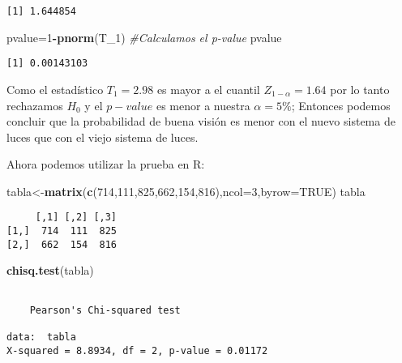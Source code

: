 \documentclass[
  a4paper,
  oneside,
  openany]{book}
\newenvironment{Shaded}{\begin{snugshade}}{\end{snugshade}}
\newcommand{\AttributeTok}[1]{\textcolor[rgb]{0.13,0.29,0.53}{#1}}
\newcommand{\CommentTok}[1]{\textcolor[rgb]{0.56,0.35,0.01}{\textit{#1}}}
\newcommand{\ConstantTok}[1]{\textcolor[rgb]{0.56,0.35,0.01}{#1}}
\newcommand{\DecValTok}[1]{\textcolor[rgb]{0.00,0.00,0.81}{#1}}
\newcommand{\FunctionTok}[1]{\textcolor[rgb]{0.13,0.29,0.53}{\textbf{#1}}}
\newcommand{\NormalTok}[1]{#1}
\newcommand{\OtherTok}[1]{\textcolor[rgb]{0.56,0.35,0.01}{#1}}
\newcommand{\SpecialCharTok}[1]{\textcolor[rgb]{0.81,0.36,0.00}{\textbf{#1}}}
\begin{document}
\begin{verbatim}
[1] 1.644854
\end{verbatim}

\begin{Shaded}
\begin{Highlighting}[]
\NormalTok{pvalue}\OtherTok{=}\DecValTok{1}\SpecialCharTok{{-}}\FunctionTok{pnorm}\NormalTok{(T\_1)  }\CommentTok{\#Calculamos el p{-}value}
\NormalTok{pvalue}
\end{Highlighting}
\end{Shaded}

\begin{verbatim}
[1] 0.00143103
\end{verbatim}

Como el estadístico \(T_1=2.98\) es mayor a el cuantil \(Z_{1-\alpha}=1.64\) por lo tanto rechazamos \(H_0\)
y el \(p-value\) es menor a nuestra \(\alpha=5\%\); Entonces podemos concluir que la probabilidad de buena visión es menor con el nuevo sistema de luces que con el viejo sistema de luces.

Ahora podemos utilizar la prueba en R:

\begin{Shaded}
\begin{Highlighting}[]
\NormalTok{tabla}\OtherTok{\textless{}{-}}\FunctionTok{matrix}\NormalTok{(}\FunctionTok{c}\NormalTok{(}\DecValTok{714}\NormalTok{,}\DecValTok{111}\NormalTok{,}\DecValTok{825}\NormalTok{,}\DecValTok{662}\NormalTok{,}\DecValTok{154}\NormalTok{,}\DecValTok{816}\NormalTok{),}\AttributeTok{ncol=}\DecValTok{3}\NormalTok{,}\AttributeTok{byrow=}\ConstantTok{TRUE}\NormalTok{)}
\NormalTok{tabla}
\end{Highlighting}
\end{Shaded}

\begin{verbatim}
     [,1] [,2] [,3]
[1,]  714  111  825
[2,]  662  154  816
\end{verbatim}

\begin{Shaded}
\begin{Highlighting}[]
\FunctionTok{chisq.test}\NormalTok{(tabla)}
\end{Highlighting}
\end{Shaded}

\begin{verbatim}

    Pearson's Chi-squared test

data:  tabla
X-squared = 8.8934, df = 2, p-value = 0.01172
\end{verbatim}
\end{document}
